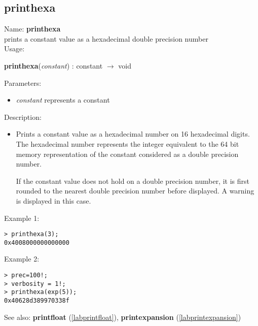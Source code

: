 \subsection{printhexa}
\label{labprinthexa}
\noindent Name: \textbf{printhexa}\\
prints a constant value as a hexadecimal double precision number\\

\noindent Usage: 
\begin{center}
\textbf{printhexa}(\emph{constant}) : \textsf{constant} $\rightarrow$ \textsf{void}\\
\end{center}
Parameters: 
\begin{itemize}
\item \emph{constant} represents a constant
\end{itemize}
\noindent Description: \begin{itemize}

\item Prints a constant value as a hexadecimal number on 16 hexadecimal
   digits. The hexadecimal number represents the integer equivalent to
   the 64 bit memory representation of the constant considered as a
   double precision number.
    
   If the constant value does not hold on a double precision number, it
   is first rounded to the nearest double precision number before
   displayed. A warning is displayed in this case.
\end{itemize}
\noindent Example 1: 
\begin{center}\begin{minipage}{15cm}\begin{Verbatim}[frame=single]
> printhexa(3);
0x4008000000000000
\end{Verbatim}
\end{minipage}\end{center}
\noindent Example 2: 
\begin{center}\begin{minipage}{15cm}\begin{Verbatim}[frame=single]
> prec=100!;
> verbosity = 1!;
> printhexa(exp(5));
0x40628d389970338f
\end{Verbatim}
\end{minipage}\end{center}
See also: \textbf{printfloat} (\ref{labprintfloat}), \textbf{printexpansion} (\ref{labprintexpansion})
